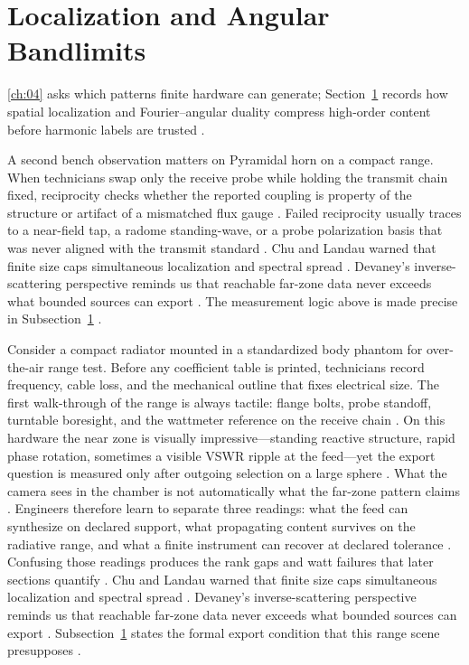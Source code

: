 \section{Localization and Angular Bandlimits}
\label{sec:ch44}
\ref{ch:04} asks which patterns finite hardware can generate; Section~\ref{sec:ch44} records how spatial localization and Fourier--angular duality compress high-order content before harmonic labels are trusted \cite{jackson1999}.
\begin{physicalvignette}
A second bench observation matters on Pyramidal horn on a compact range. When technicians swap only the receive probe while holding the transmit chain fixed, reciprocity checks whether the reported coupling is property of the structure or artifact of a mismatched flux gauge \cite{stratton1941}. Failed reciprocity usually traces to a near-field tap, a radome standing-wave, or a probe polarization basis that was never aligned with the transmit standard \cite{hansen1988}.
Chu and Landau warned that finite size caps simultaneous localization and spectral spread \cite{chu1948}. Devaney's inverse-scattering perspective reminds us that reachable far-zone data never exceeds what bounded sources can export \cite{devaney2004}.
The measurement logic above is made precise in Subsection~\ref{sec:ch44} \cite{stratton1941}.
\end{physicalvignette}
\begin{physicalvignette}
Consider a compact radiator mounted in a standardized body phantom for over-the-air range test. Before any coefficient table is printed, technicians record frequency, cable loss, and the mechanical outline that fixes electrical size. The first walk-through of the range is always tactile: flange bolts, probe standoff, turntable boresight, and the wattmeter reference on the receive chain \cite{hansen1988}.
On this hardware the near zone is visually impressive---standing reactive structure, rapid phase rotation, sometimes a visible VSWR ripple at the feed---yet the export question is measured only after outgoing selection on a large sphere \cite{harrington2001}. What the camera sees in the chamber is not automatically what the far-zone pattern claims \cite{stratton1941}.
Engineers therefore learn to separate three readings: what the feed can synthesize on declared support, what propagating content survives on the radiative range, and what a finite instrument can recover at declared tolerance \cite{devaney2004}. Confusing those readings produces the rank gaps and watt failures that later sections quantify \cite{pal2026}.
Chu and Landau warned that finite size caps simultaneous localization and spectral spread \cite{chu1948}. Devaney's inverse-scattering perspective reminds us that reachable far-zone data never exceeds what bounded sources can export \cite{devaney2004}.
Subsection~\ref{sec:ch44} states the formal export condition that this range scene presupposes \cite{stratton1941}.
\end{physicalvignette}
